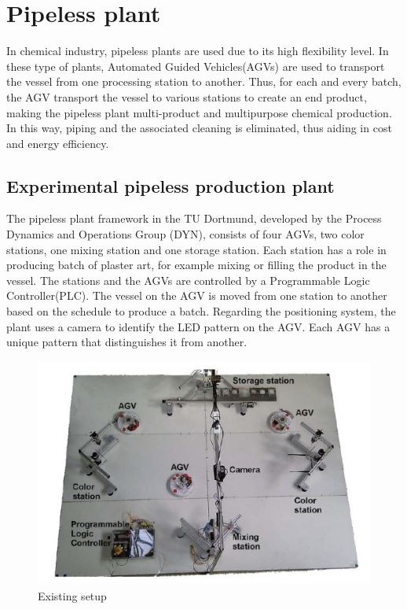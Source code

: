 \section{Pipeless plant} %

In chemical industry, pipeless plants are used due to its high flexibility level. In these type of plants, Automated Guided Vehicles(AGVs) are used to transport the vessel from one processing station to another. Thus, for each and every batch, the AGV transport the vessel to various stations to create an end product, making the pipeless plant multi-product and multipurpose chemical production. In this way, piping and the associated cleaning is eliminated, thus aiding in cost and energy efficiency.

\subsection{Experimental pipeless production plant}
 
 The pipeless plant framework in the TU Dortmund, developed by the Process Dynamics and Operations Group (DYN), consists of four AGVs, two color stations, one mixing station and one storage station. Each station has a role in producing batch of plaster art, for example mixing or filling the product in the vessel. The stations and the AGVs are controlled by a Programmable Logic Controller(PLC). The vessel on the AGV is moved from one station to another based on the schedule to produce a batch. Regarding the positioning system, the plant uses a camera to identify the LED pattern on the AGV. Each AGV has a unique pattern that distinguishes it from another.


\begin{figure}[!htbp]
	\centering
	\includegraphics[width=14cm]{Pictures/Plant.png}
	\caption{Existing setup}
	\label{Pipeless plant}
\end{figure}


